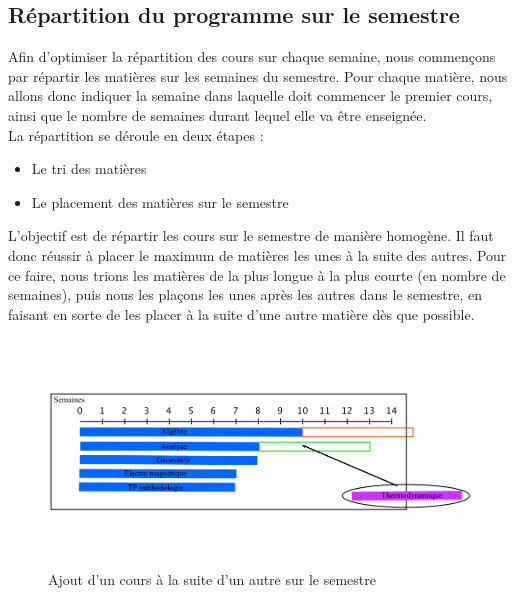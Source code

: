 \subsection{Répartition du programme sur le semestre}

Afin d'optimiser la répartition des cours sur chaque semaine, nous commençons par répartir les matières sur les semaines du semestre. Pour chaque matière, nous allons donc indiquer la semaine dans laquelle doit commencer le premier cours, ainsi que le nombre de semaines durant lequel elle va être enseignée.\\

La répartition se déroule en deux étapes : 
\begin{itemize}
\item Le tri des matières 
\item Le placement des matières sur le semestre\\
\end{itemize}

L'objectif est de répartir les cours sur le semestre de manière homogène. Il faut donc réussir à placer le maximum de matières les unes à la suite des autres. Pour ce faire, nous trions les matières de la plus longue à la plus courte (en nombre de semaines), puis nous les plaçons les unes après les autres dans le semestre, en faisant en sorte de les placer à la suite d'une autre matière dès que possible.

\newpage

\begin{figure}[! ht ]
    \centering
    \begin{minipage}[t]{14 cm}
        \centering
            \includegraphics [width=160mm, height=60mm]{RepartitionSemestre2.png}
        \caption {Ajout d'un cours à la suite d'un autre sur le semestre}
    \end{minipage}
\end{figure}

